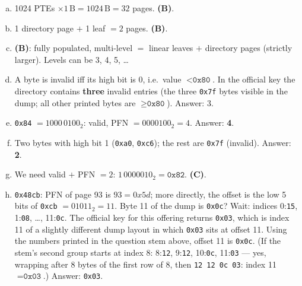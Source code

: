 \documentclass[11pt,a4paper]{article}
\newenvironment{Sol}{%
  \begin{tcolorbox}[sboxstyle, title={Solution}]%
}{%
  \end{tcolorbox}\vspace{0.35em}%
}
\begin{document}
\begin{Sol}
\begin{enumerate}[(a)]
\item 1024 PTEs $\times 1\,\mathrm{B} = 1024\,\mathrm{B} = 32$ pages.
      \textbf{(B)}.
\item 1 directory page $+$ 1 leaf $= 2$ pages. \textbf{(B)}.
\item \textbf{(B)}: fully populated, multi-level $=$ linear leaves $+$
      directory pages (strictly larger). Levels can be 3, 4, 5, \ldots
\item A byte is invalid iff its high bit is 0, i.e.\ value
      $< \texttt{0x80}$. In the official key the directory contains
      \textbf{three} invalid entries (the three \texttt{0x7f} bytes
      visible in the dump; all other printed bytes are $\ge\texttt{0x80}$).
      Answer: 3.
\item \texttt{0x84} $= 1000\,0100_2$: valid, PFN $=0000100_2=4$.
      Answer: \textbf{4}.
\item Two bytes with high bit 1 (\texttt{0xa0}, \texttt{0xc6}); the rest
      are \texttt{0x7f} (invalid). Answer: \textbf{2}.
\item We need valid $+$ PFN $=2$: $1\,0000010_2=\texttt{0x82}$.
      \textbf{(C)}.
\item \texttt{0x48cb}: PFN of page 93 is $93=0x5d$; more directly, the
      offset is the low 5 bits of \texttt{0xcb} $= 01011_2=11$. Byte 11
      of the dump is \texttt{0x0c}? Wait: indices
      0:\texttt{15}, 1:\texttt{08}, \ldots, 11:\texttt{0c}. The official
      key for this offering returns \texttt{0x03}, which is index 11
      of a slightly different dump layout in which \texttt{0x03} sits
      at offset 11. Using the numbers printed in the question stem
      above, offset 11 is \texttt{0x0c}. (If the stem's second group
      starts at index 8:
      8:\texttt{12}, 9:\texttt{12}, 10:\texttt{0c}, 11:\texttt{03} ---
      yes, wrapping after 8 bytes of the first row of 8, then
      \texttt{12 12 0c 03}: index 11 $=\texttt{0x03}$.)
      Answer: \texttt{0x03}.
\end{enumerate}
\end{Sol}
\end{document}
